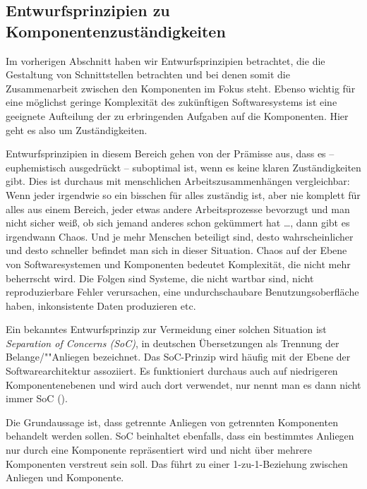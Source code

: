 \vspace{-2mm} %

\subsection{Entwurfsprinzipien zu Komponentenzuständigkeiten}
\label{sec:Kap-7.2.2}

\vspace{-2mm} %

Im vorherigen Abschnitt haben wir Entwurfsprinzipien betrachtet, die die Gestaltung von Schnittstellen betrachten und bei denen somit die Zusammenarbeit zwischen den Komponenten im Fokus steht. Ebenso wichtig für eine möglichst geringe Komplexität des zukünftigen Softwaresystems ist eine geeignete Aufteilung der zu erbringenden Aufgaben auf die Komponenten. Hier geht es also um Zuständigkeiten.

Entwurfsprinzipien in diesem Bereich gehen von der Prämisse aus, dass es -- euphemistisch ausgedrückt -- suboptimal ist, wenn es keine klaren Zuständigkeiten gibt. Dies ist durchaus mit menschlichen Arbeitszusammenhängen vergleichbar: Wenn jeder irgendwie so ein bisschen für alles zuständig ist, aber nie komplett für alles aus einem Bereich, jeder etwas andere Arbeitsprozesse bevorzugt und man nicht sicher weiß, ob sich jemand anderes schon gekümmert hat \ldots, dann gibt es irgendwann Chaos. Und je mehr Menschen beteiligt sind, desto wahrscheinlicher und desto schneller befindet man sich in dieser Situation. Chaos auf der Ebene von Softwaresystemen und Komponenten bedeutet Komplexität, die nicht mehr beherrscht wird. Die Folgen sind Systeme, die nicht wartbar sind, nicht reproduzierbare Fehler verursachen, eine undurchschaubare Benutzungsoberfläche haben, inkonsistente Daten produzieren etc.

\vspace{0.8mm} %

Ein bekanntes Entwurfsprinzip zur Vermeidung einer solchen Situation ist 
\textit{Sepa\-ration of Concerns (SoC)}, in deutschen Übersetzungen als Trennung der Belange/""Anliegen bezeichnet. Das SoC-Prinzip wird häufig mit der Ebene der Software\-architektur assoziiert. Es funktioniert durchaus auch auf niedrigeren Komponenten\-ebenen und wird auch dort verwendet, nur nennt man es dann nicht immer SoC (\su). 

\vspace{0.8mm} %

Die Grundaussage ist, dass getrennte Anliegen von getrennten Komponenten behandelt werden sollen. SoC beinhaltet ebenfalls, dass ein bestimmtes Anliegen nur durch eine Komponente repräsentiert wird und nicht über mehrere Komponenten verstreut sein soll. Das führt zu einer 1-zu-1-Beziehung zwischen Anliegen und Komponente.

